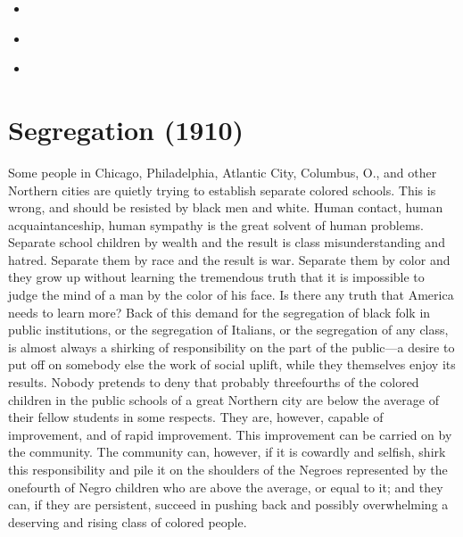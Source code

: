 \documentclass[letterpaper,10pt,english]{jupyterBook}
\begin{document}
\begin{itemize}
\item {} 
\sphinxAtStartPar
{\hyperref[\detokenize{Volumes/41/04/segregation_in_the_north::doc}]{}}

\item {} 
\sphinxAtStartPar
{\hyperref[\detokenize{Volumes/41/05/segregation::doc}]{}}

\item {} 
\sphinxAtStartPar
{\hyperref[\detokenize{Volumes/40/03/Color_caste_in_the_united_states::doc}]{}}

\end{itemize}


\section{Segregation (1910)}
\label{\detokenize{Volumes/01/01/Segregation:segregation-1910}}\label{\detokenize{Volumes/01/01/Segregation::doc}}
\sphinxAtStartPar
Some people in Chicago, Philadelphia, Atlantic City, Columbus, O., and other Northern cities are quietly trying to establish separate colored schools. This is wrong, and should be resisted by black men and white. Human contact, human acquaintanceship, human sympathy is the great solvent of human problems. Separate school children by wealth and the result is class misunderstanding and hatred. Separate them by race and the result is war. Separate them by color and they grow up without learning the tremendous truth that it is impossible to judge the mind of a man by the color of his face. Is there any truth that America needs to learn more? Back of this demand for the segregation of black folk in public institutions, or the segregation of Italians, or the segregation of any class, is almost always a shirking of responsibility on the part of the public—a desire to put off on somebody else the work of social uplift, while they themselves enjoy its results. Nobody pretends to deny that probably three\sphinxhyphen{}fourths of the colored children in the public schools of a great Northern city are below the average of their fellow students in some respects. They are, however, capable of improvement, and of rapid improvement. This improvement can be carried on by the community. The community can, however, if it is cowardly and selfish, shirk this responsibility and pile it on the shoulders of the Negroes represented by the one\sphinxhyphen{}fourth of Negro children who are above the average, or equal to it; and they can, if they are persistent, succeed in pushing back and possibly overwhelming a deserving and rising class of colored people.
\end{document}
